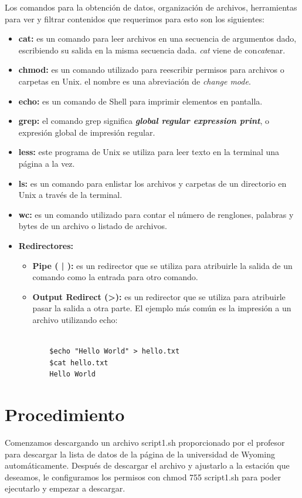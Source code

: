 \documentclass{article}
\begin{document}
Los comandos para la obtención de datos, organización de archivos, herramientas para ver y filtrar contenidos que requerimos para esto son los siguientes:
\begin{itemize}
\item \textbf{cat:} es un comando para leer archivos en una secuencia de argumentos dado, escribiendo su salida en la misma secuencia dada. \textit{cat} viene de con\textit{cat}enar.
\item \textbf{chmod:} es un comando utilizado para reescribir permisos para archivos o carpetas en Unix. el nombre es una abreviación de \textit{change mode}.
\item \textbf{echo:} es un comando de Shell para imprimir elementos en pantalla.
\item \textbf{grep:} el comando grep significa \textit{\textbf{global regular expression print}}, o expresión global de impresión regular.
\item \textbf{less:} este programa de Unix se utiliza para leer texto en la terminal una página a la vez.
\item \textbf{ls:} es un comando para enlistar los archivos y carpetas de un directorio en Unix a través de la terminal.
\item \textbf{wc:} es un comando utilizado para contar el número de renglones, palabras y bytes de un archivo o listado de archivos.
\item \textbf{Redirectores:}
  \begin{itemize}
  \item \textbf{ Pipe ( | ):} es un redirector que se utiliza para atribuirle la salida de un comando como la entrada para otro comando.
  \item \textbf{ Output Redirect (>):} es un redirector que se utiliza para atribuirle pasar la salida a otra parte. El ejemplo más común es la impresión a un archivo utilizando echo: 
  \begin{verbatim}
  	
    $echo "Hello World" > hello.txt
    $cat hello.txt
    Hello World
  \end{verbatim}
  \end{itemize}
\end{itemize}
\section{Procedimiento}

Comenzamos descargando un archivo script1.sh proporcionado por el profesor para descargar la lista de datos de la página de la universidad de Wyoming automáticamente. Después de descargar el archivo y ajustarlo a la estación que deseamos, le configuramos los permisos con chmod 755 script1.sh para poder ejecutarlo y empezar a descargar.
\end{document}
